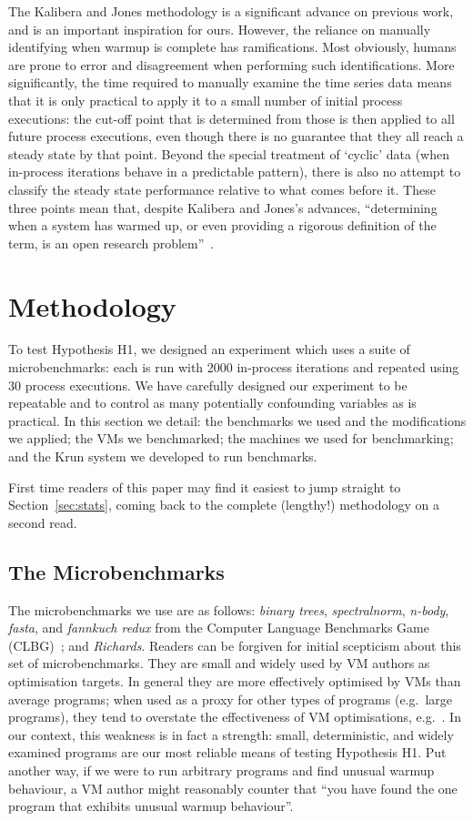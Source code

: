 \documentclass[acmsmall]{acmart}\settopmatter{printfolios=true}
\newcommand{\kalibera}{Kalibera and Jones\xspace}
\newcommand{\krun}{Krun\xspace}
\newcommand{\hypone}{H1\xspace}
\newcommand{\binarytrees}{\emph{binary trees}\xspace}
\newcommand{\richards}{\emph{Richards}\xspace}
\newcommand{\spectralnorm}{\emph{spectralnorm}\xspace}
\newcommand{\nbody}{\emph{n-body}\xspace}
\newcommand{\fasta}{\emph{fasta}\xspace}
\newcommand{\fannkuch}{\emph{fannkuch redux}\xspace}
\newcommand{\numpexecs}{30\xspace}
\newcommand{\numiterations}{2000\xspace}
\begin{document}
The \kalibera methodology is a significant advance on previous work,
and is an important inspiration for ours. However, the reliance
on manually identifying when warmup is complete has ramifications. Most
obviously, humans are prone to error and disagreement when performing
such identifications. More significantly, the time required
to manually examine the time series data means that it is only practical to apply it to a small number
of initial process executions: the cut-off point that is determined from those
is then applied to all future process executions, even though there is no
guarantee that they all reach a steady state by that point. Beyond the
special treatment of `cyclic' data (when in-process iterations behave in a
predictable pattern), there is also no attempt to classify the steady state
performance relative to what comes before it. These three points mean that,
despite \kalibera's advances,
``determining when a system has warmed up, or even providing a
rigorous definition of the term, is an open research problem''~\cite{seaton15phd}.


\section{Methodology}
\label{sec:methodology}

To test Hypothesis \hypone, we designed an experiment which uses a suite of
microbenchmarks: each is run with \numiterations in-process iterations and repeated
using \numpexecs process executions. We have carefully designed our
experiment to be repeatable and to control as many potentially confounding variables as
is practical. In this section we detail: the benchmarks we used and the modifications we
applied; the VMs we benchmarked; the machines we used for benchmarking; and the
\krun system we developed to run benchmarks.

First time readers of this paper may find it easiest to jump straight to
Section~\ref{sec:stats}, coming back to the complete (lengthy!) methodology
on a second read.


\subsection{The Microbenchmarks}
\label{sec:microbenchmarks}

The microbenchmarks we use are as follows: \binarytrees, \spectralnorm, \nbody,
\fasta, and \fannkuch from the Computer Language Benchmarks Game (CLBG)~\cite{clbg}; and
\richards. Readers can be forgiven for initial scepticism about this set of microbenchmarks.
They are small and widely
used by VM authors as optimisation targets. In general they are more effectively
optimised by VMs than average programs; when used as a proxy for other types
of programs (e.g.~large programs), they tend to overstate the effectiveness of
VM optimisations, e.g.~\cite{ratanaworabhan09jsmeter}. In our context, this weakness is in fact a strength:
small, deterministic, and widely examined programs are our most
reliable means of testing Hypothesis \hypone. Put another way, if we were to run arbitrary programs
and find unusual warmup behaviour, a VM author might reasonably counter that
``you have found the one program that exhibits unusual warmup behaviour''.
\end{document}
